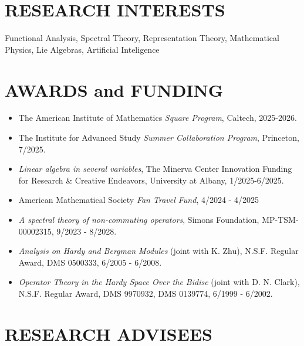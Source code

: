 \documentclass[12pt]{res} %
\begin{document}
\begin{resume}
\section{RESEARCH INTERESTS}

\vspace{5mm} 

Functional Analysis, Spectral Theory, Representation Theory, Mathematical Physics, Lie Algebras, Artificial Inteligence


\section{AWARDS and FUNDING}

\vspace{8mm} 
 
\begin{itemize} \itemsep -2pt  %
\item The American Institute of Mathematics {\em Square Program}, Caltech, 2025-2026.
\item The Institute for Advanced Study {\em Summer Collaboration Program}, Princeton, 7/2025.
\item {\em Linear algebra in several variables}, The Minerva Center Innovation Funding for Research \& Creative Endeavors, University at Albany, 1/2025-6/2025.
\item American Mathematical Society {\em Fan Travel Fund}, 4/2024 - 4/2025
\item {\em A spectral theory of non-commuting operators}, Simons Foundation, MP-TSM-00002315, 9/2023 - 8/2028.
\item  {\em Analysis on Hardy and Bergman Modules} (joint with K. Zhu), N.S.F. Regular Award, DMS 0500333, 6/2005 - 6/2008.
\item {\em Operator Theory in the Hardy Space Over the Bidisc} (joint with D. N. Clark), N.S.F. Regular Award, DMS 9970932, DMS 0139774, 6/1999 - 6/2002.
\end{itemize}


\section{RESEARCH ADVISEES}

\vspace{8mm}


\end{resume}
\end{document}
